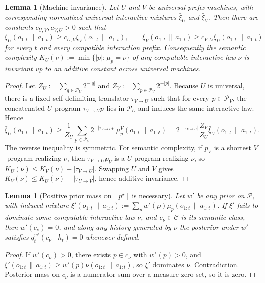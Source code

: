 \documentclass[11pt]{article}
\newtheorem{lemma}[theorem]{Lemma}
\theoremstyle{definition}
\theoremstyle{remark}
\newcommand{\Ccal}{\mathcal{C}}
\newcommand{\Pcal}{\mathcal{P}}
\newcommand{\givena}{\,\|\,}
\newcommand{\barxi}{\bar{\xi}}
\begin{document}
\begin{lemma}[Machine invariance]
\label{lem:prior-invariance}
Let $U$ and $V$ be universal prefix machines, with corresponding normalized universal interactive mixtures $\barxi_U$ and $\barxi_V$. Then there are constants $c_{U,V}, c_{V,U}>0$ such that
\[
\barxi_U(o_{1:t}\givena a_{1:t})\ge c_{U,V}\barxi_V(o_{1:t}\givena a_{1:t}),
\qquad
\barxi_V(o_{1:t}\givena a_{1:t})\ge c_{V,U}\barxi_U(o_{1:t}\givena a_{1:t})
\]
for every $t$ and every compatible interaction prefix. Consequently the semantic complexity $K_U(\nu):=\min\{|p|:\mu_p=\nu\}$ of any computable interactive law $\nu$ is invariant up to an additive constant across universal machines.
\end{lemma}

\begin{proof}
Let $Z_U:=\sum_{q\in\Pcal_U}2^{-|q|}$ and $Z_V:=\sum_{p\in\Pcal_V}2^{-|p|}$. Because $U$ is universal, there is a fixed self-delimiting translator $\tau_{V\to U}$ such that for every $p\in\Pcal_V$, the concatenated $U$-program $\tau_{V\to U}p$ lies in $\Pcal_U$ and induces the same interactive law. Hence
\[
\barxi_U(o_{1:t}\givena a_{1:t})
\ge
\frac{1}{Z_U}\sum_{p\in\Pcal_V}2^{-|\tau_{V\to U}p|}\mu_p^V(o_{1:t}\givena a_{1:t})
=
2^{-|\tau_{V\to U}|}\frac{Z_V}{Z_U}\barxi_V(o_{1:t}\givena a_{1:t}).
\]
The reverse inequality is symmetric. For semantic complexity, if $p_V$ is a shortest $V$-program realizing $\nu$, then $\tau_{V\to U}p_V$ is a $U$-program realizing $\nu$, so $K_U(\nu)\le K_V(\nu)+|\tau_{V\to U}|$. Swapping $U$ and $V$ gives $K_V(\nu)\le K_U(\nu)+|\tau_{U\to V}|$, hence additive invariance.
\end{proof}

\begin{lemma}[{Positive prior mass on $[p^\star]$ is necessary}]
\label{lem:prior-necessity}
Let $w'$ be any prior on $\Pcal$, with induced mixture $\xi'(o_{1:t}\givena a_{1:t}):=\sum_p w'(p)\mu_p(o_{1:t}\givena a_{1:t})$. If $\xi'$ fails to dominate some computable interactive law $\nu$, and $c_\nu\in\Ccal$ is its semantic class, then $w'(c_\nu)=0$, and along any history generated by $\nu$ the posterior under $w'$ satisfies $q_t^{w'}(c_\nu\mid h_t)=0$ whenever defined.
\end{lemma}

\begin{proof}
If $w'(c_\nu)>0$, there exists $p\in c_\nu$ with $w'(p)>0$, and $\xi'(o_{1:t}\givena a_{1:t})\ge w'(p)\nu(o_{1:t}\givena a_{1:t})$, so $\xi'$ dominates $\nu$. Contradiction. Posterior mass on $c_\nu$ is a numerator sum over a measure-zero set, so it is zero.
\end{proof}
\end{document}
